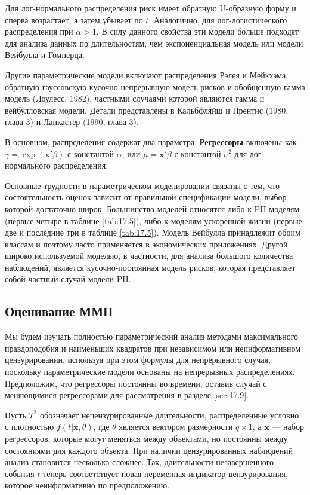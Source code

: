 Для лог-нормального распределения риск имеет обратную U-образную форму и сперва возрастает, а затем убывает по $t$. Аналогично, для лог-логистического распределения при $\alpha>1$. В силу данного свойства эти модели больше подходят для анализа данных по длительностям, чем экспоненциальная модель или модели Вейбулла и Гомперца.

Другие параметрические модели включают распределения Рэлея и Мейкхэма, обратную гауссовскую кусочно-непрерывную модель рисков и обобщенную гамма модель (Лоулесс, 1982), частными случаями которой являются гамма и вейбулловская модели. Детали представлены в Кальбфляйш и Прентис (1980, глава 3) и Ланкастер (1990, глава 3).

В основном, распределения содержат два параметра. %
\textbf{Регрессоры} включены как $\gamma=\exp{(\mathbf{x}'\beta)}$ с константой $\alpha$, или $\mu=\mathbf{x}'\beta$ с константой $\sigma^2$ для лог-нормального распределения.

Основные трудности в параметрическом моделировании связаны с тем, что состоятельность оценок зависит от правильной спецификации модели, выбор которой достаточно широк. Большинство моделей относятся либо к PH моделям (первые четыре в таблице \ref{tab:17.5}), либо к моделям ускоренной жизни (первые две и последние три в таблице \ref{tab:17.5}). Модель Вейбулла принадлежит обоим классам и поэтому часто применяется в экономических приложениях. Другой широко используемой моделью, в частности, для анализа большого количества наблюдений, является кусочно-постоянная модель рисков, которая представляет собой частный случай модели PH.


\subsection{Оценивание ММП}\label{sec:17.6.3}

\noindent
Мы будем изучать полностью параметрический анализ методами максимального правдоподобия и наименьших квадратов при независимом или неинформативном цензурировании, используя при этом формулы для непрерывного случая, поскольку параметрические модели основаны на непрерывных распределениях. Предположим, что регрессоры постоянны во времени, оставив случай с меняющимися регрессорами для рассмотрения в разделе \ref{sec:17.9}.

Пусть $T^*$ обозначает нецензурированные длительности, распределенные условно с плотностью $f(t|\mathbf{x},\theta)$, где $\theta$ является вектором размерности $q\times1$, а $\mathbf{x}$ --- набор регрессоров, которые могут меняться между объектами, но постоянны между состояниями для каждого объекта. При наличии цензурированных наблюдений анализ становится несколько сложнее. Так, длительности незавершенного события $t$ теперь соответствует новая переменная-индикатор цензурирования, которое неинформативно по предположению.

